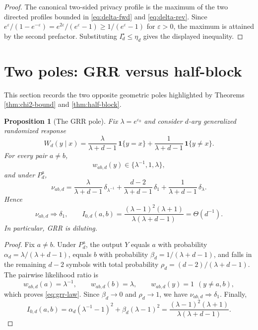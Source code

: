 \documentclass[11pt]{amsart}
\numberwithin{equation}{section}
\newtheorem{proposition}[theorem]{Proposition}
\theoremstyle{definition}
\newcommand{\one}{\mathbf 1}
\begin{document}
\begin{proof}
The canonical two-sided privacy profile is the maximum of the two directed profiles bounded in
\eqref{eq:delta-fwd} and \eqref{eq:delta-rev}.  Since
$e^\varepsilon/(1-e^{-\varepsilon})=e^{2\varepsilon}/(e^\varepsilon-1)\ge 1/(e^\varepsilon-1)$
for $\varepsilon>0$, the maximum is attained by the second prefactor.  Substituting
$I_d^\star\le \eta_d$ gives the displayed inequality.
\end{proof}

\section{Two poles: GRR versus half-block}

This section records the two opposite geometric poles highlighted by Theorems
\ref{thm:chi2-bound} and \ref{thm:half-block}.

\begin{proposition}[The GRR pole]\label{prop:grr}
Fix $\lambda=e^{\varepsilon_0}$ and consider $d$-ary generalized randomized response
\[
W_d(y\mid x)=
\frac{\lambda}{\lambda+d-1}\,\one\{y=x\}
+
\frac{1}{\lambda+d-1}\,\one\{y\neq x\}. \tag{7.1}\label{eq:grr}
\]
For every pair $a\neq b$,
\[
w_{ab,d}(y)\in \{\lambda^{-1},1,\lambda\},
\]
and under \(P_d^a\),
\[
\nu_{ab,d}
=
\frac{\lambda}{\lambda+d-1}\,\delta_{\lambda^{-1}}
+
\frac{d-2}{\lambda+d-1}\,\delta_{1}
+
\frac{1}{\lambda+d-1}\,\delta_{\lambda}. \tag{7.2}\label{eq:grr-law}
\]
Hence
\[
\nu_{ab,d}\Rightarrow \delta_1,
\qquad
I_{0,d}(a,b)
=
\frac{(\lambda-1)^2(\lambda+1)}{\lambda(\lambda+d-1)}
=
\Theta(d^{-1}). \tag{7.3}\label{eq:grr-chi}
\]
In particular, GRR is diluting.
\end{proposition}

\begin{proof}
Fix $a\neq b$.  Under \(P_d^a\), the output $Y$ equals \(a\) with probability
\(
\alpha_d=\lambda/(\lambda+d-1)
\),
equals \(b\) with probability
\(
\beta_d=1/(\lambda+d-1)
\),
and falls in the remaining \(d-2\) symbols with total probability
\(
\rho_d=(d-2)/(\lambda+d-1)
\).
The pairwise likelihood ratio is
\[
w_{ab,d}(a)=\lambda^{-1},\qquad
w_{ab,d}(b)=\lambda,\qquad
w_{ab,d}(y)=1 \ \ (y\neq a,b),
\]
which proves \eqref{eq:grr-law}.  Since \(\beta_d\to0\) and \(\rho_d\to1\), we have
\(
\nu_{ab,d}\Rightarrow \delta_1
\).
Finally,
\[
I_{0,d}(a,b)
=
\alpha_d(\lambda^{-1}-1)^2+\beta_d(\lambda-1)^2
=
\frac{(\lambda-1)^2(\lambda+1)}{\lambda(\lambda+d-1)}.
\]
\end{proof}
\end{document}
